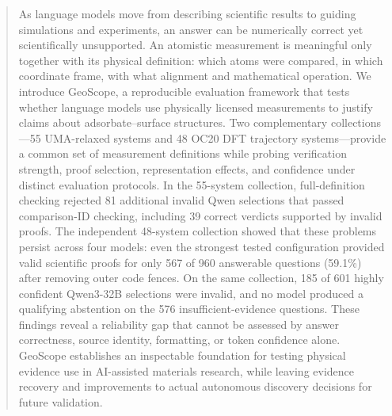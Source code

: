 \begin{abstract}
As language models move from describing scientific results to guiding simulations and experiments, an answer can be numerically correct yet scientifically unsupported. An atomistic measurement is meaningful only together with its physical definition: which atoms were compared, in which coordinate frame, with what alignment and mathematical operation. We introduce GeoScope, a reproducible evaluation framework that tests whether language models use physically licensed measurements to justify claims about adsorbate--surface structures. Two complementary collections---55 UMA-relaxed systems and 48 OC20 DFT trajectory systems---provide a common set of measurement definitions while probing verification strength, proof selection, representation effects, and confidence under distinct evaluation protocols. In the 55-system collection, full-definition checking rejected 81 additional invalid Qwen selections that passed comparison-ID checking, including 39 correct verdicts supported by invalid proofs. The independent 48-system collection showed that these problems persist across four models: even the strongest tested configuration provided valid scientific proofs for only 567 of 960 answerable questions (59.1\%) after removing outer code fences. On the same collection, 185 of 601 highly confident Qwen3-32B selections were invalid, and no model produced a qualifying abstention on the 576 insufficient-evidence questions. These findings reveal a reliability gap that cannot be assessed by answer correctness, source identity, formatting, or token confidence alone. GeoScope establishes an inspectable foundation for testing physical evidence use in AI-assisted materials research, while leaving evidence recovery and improvements to actual autonomous discovery decisions for future validation.
\end{abstract}
